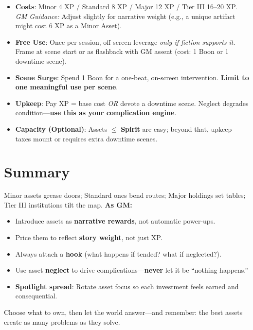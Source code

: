 \begin{tcolorbox}[colback=blue!5!white,colframe=blue!75!black,title=Asset Quick Reference (GM),fonttitle=\bfseries,breakable]
\begin{itemize}
  \item \textbf{Costs}: Minor 4 XP / Standard 8 XP / Major 12 XP / Tier III 16--20 XP.  
        \textit{GM Guidance:} Adjust slightly for narrative weight (e.g., a unique artifact might cost 6 XP as a Minor Asset).  
  \item \textbf{Free Use}: Once per session, off-screen leverage \emph{only if fiction supports it}. Frame at scene start or as flashback with GM assent (cost: 1 Boon or 1 downtime scene).  
  \item \textbf{Scene Surge}: Spend 1 Boon for a one-beat, on-screen intervention. \textbf{Limit to one meaningful use per scene}.  
  \item \textbf{Upkeep}: Pay XP = base cost \emph{OR} devote a downtime scene. Neglect degrades condition---\textbf{use this as your complication engine}.  
  \item \textbf{Capacity (Optional)}: Assets $\leq$ \textbf{Spirit} are easy; beyond that, upkeep taxes mount or requires extra downtime scenes.  
\end{itemize}
\end{tcolorbox}

\section{Summary}
Minor assets grease doors; Standard ones bend routes; Major holdings set tables; Tier III institutions tilt the map. \textbf{As GM:}  
\begin{itemize}
  \item Introduce assets as \textbf{narrative rewards}, not automatic power-ups.  
  \item Price them to reflect \textbf{story weight}, not just XP.  
  \item Always attach a \textbf{hook} (what happens if tended? what if neglected?).  
  \item Use asset \textbf{neglect} to drive complications---\textbf{never} let it be ``nothing happens.''  
  \item \textbf{Spotlight spread}: Rotate asset focus so each investment feels earned and consequential.  
\end{itemize}
Choose what to own, then let the world answer---and remember: the best assets create as many problems as they solve.